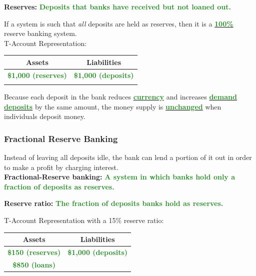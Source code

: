\documentclass[11pt]{article}\usepackage[]{graphicx}\usepackage[]{color}
\theoremstyle{definition}
\newcommand{\ddp}[1]{{\textbf{\textcolor{ForestGreen}{#1}}}}
\newcommand{\dd}[1]{{\underline{\textbf{\textcolor{ForestGreen}{#1}}}}}
\newcommand{\defn}[1]{\textbf{#1}}
\begin{document}
\defn{Reserves:} \ddp{Deposits that banks have received but not loaned out.\\}

If a system is such that \textit{all} deposits are held as reserves, then it is a \dd{100\%} reserve banking system. 
\\

T-Account Representation:

\begin{table}[ht]
	\centering
	\begin{tabular}{c|c }        
		
		Assets & Liabilities \\
		\hline
	 \ddp{\$1,000 (reserves)}	&  \ddp{\$1,000 (deposits)}\\
		
		& \\
		
	\end{tabular}
\end{table}

Because each deposit in the bank reduces \dd{currency} and increases \dd{demand deposits} by the same amount, the money supply is \dd{unchanged} when individuals deposit money. 

\subsubsection*{Fractional Reserve Banking}

Instead of leaving all deposits idle, the bank can lend a portion of it out in order to make a profit by charging interest. 
\\

\defn{Fractional-Reserve banking:} \ddp{A system in which banks hold only a fraction of deposits as reserves.\\}

\defn{Reserve ratio:} \ddp{The fraction of deposits banks hold as reserves.\\}

T-Account Representation with a 15\% reserve ratio:

\begin{table}[ht]
	\centering
	\begin{tabular}{ c|c }        
		
		Assets & Liabilities \\
		\hline
		\ddp{\$150 (reserves)}&  \ddp{\$1,000 (deposits)}\\
		
	\ddp{\$850 (loans)}	& \\
		
	\end{tabular}
\end{table}
\end{document}
